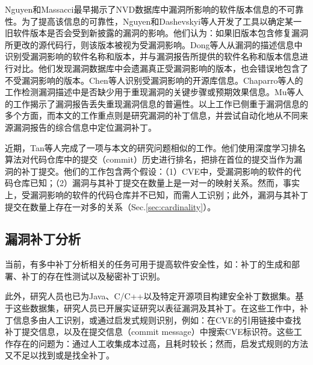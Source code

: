 Nguyen和Massacci\cite{nguyen2013reliability}最早揭示了NVD数据库中漏洞所影响的软件版本信息的不可靠性。为了提高该信息的可靠性，Nguyen\cite{nguyen2016automatic}和Dashevskyi等人\cite{dashevskyi2018screening}开发了工具以确定某一旧软件版本是否会受到新披露的漏洞的影响。他们认为：如果旧版本包含修复漏洞所更改的源代码行，则该版本被视为受漏洞影响。Dong等人\cite{dong2019towards}从漏洞的描述信息中识别受漏洞影响的软件名称和版本，并与漏洞报告所提供的软件名称和版本信息进行对比。他们发现漏洞数据库中会遗漏真正受漏洞影响的版本，也会错误地包含了不受漏洞影响的版本。Chen等人\cite{chen2020automated}识别受漏洞影响的开源库信息。Chaparro等人的工作\cite{chaparro2017detecting}检测漏洞描述中是否缺少用于重现漏洞的关键步骤或预期效果信息。Mu等人的工作\cite{mu2018understanding}揭示了漏洞报告丢失重现漏洞信息的普遍性。以上工作已侧重于漏洞信息的多个方面，而本文的工作重点则是研究漏洞的补丁信息，并尝试自动化地从不同来源漏洞报告的综合信息中定位漏洞补丁。

近期，Tan等人完成了一项与本文的研究问题相似的工作\cite{Tan2021locating}。他们使用深度学习排名算法对代码仓库中的提交（commit）历史进行排名，把排在首位的提交当作为漏洞的补丁提交。他们的工作包含两个假设：（1）CVE中，受漏洞影响的软件的代码仓库已知；（2）漏洞与其补丁提交在数量上是一对一的映射关系。然而，事实上，受漏洞影响的软件的代码仓库并不已知，而需人工识别；此外，漏洞与其补丁提交在数量上存在一对多的关系（Sec.\ref{sec:cardinality}）。


\subsection{漏洞补丁分析}
当前，有多中补丁分析相关的任务可用于提高软件安全性，如：补丁的生成和部署\cite{mulliner2013patchdroid,duan2019automating,xu2020automatic}、补丁的存在性测试\cite{zhang2018precise,jiang2020pdiff,dai2020bscout}以及秘密补丁识别\cite{xu2017spain,zhou2017automated,sabetta2018practical,chen2020machine}。

此外，研究人员也已为Java\cite{ponta2019manually}、C/C++\cite{fan2020ac}以及特定开源项目\cite{jimenez2018enabling}构建安全补丁数据集。基于这些数据集，研究人员已开展实证研究以表征漏洞及其补丁\cite{zaman2011security,li2017large,liu2020large,antal2020exploring}。在这些工作中，补丁信息多由人工识别\cite{xu2020automatic,jiang2020pdiff,dai2020bscout,xu2017spain,zhou2017automated,sabetta2018practical,chen2020machine,ponta2019manually,zaman2011security}，或通过启发式规则识别，例如：在CVE的引用链接中查找补丁提交信息\cite{duan2019automating,fan2020ac,jimenez2018enabling,li2017large,liu2020large}，以及在提交信息（commit message）中搜索CVE标识符\cite{fan2020ac, jimenez2018enabling, antal2020exploring}。这些工作存在的问题为：通过人工收集成本过高，且耗时较长；然而，启发式规则的方法又不足以找到或是找全补丁。


